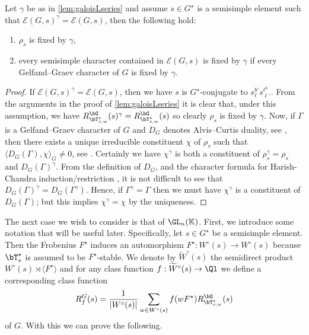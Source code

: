 \documentclass[eqthmnum, nocolour]{jt-calcs}
\begin{document}
\begin{prop}\label{prop:semisimple-chars-sigma-fixed}
Let $\gamma$ be as in \cref{lem:galoisLseries} and assume $s \in G^{\star}$ is a semisimple element such that $\mathcal{E}(G,s)^{\gamma} = \mathcal{E}(G,s)$, then the following hold:
\begin{enumerate}
	\item $\rho_s$ is fixed by $\gamma$,
	\item every semisimple character contained in $\mathcal{E}(G,s)$ is fixed by $\gamma$ if every Gelfand--Graev character of $G$ is fixed by $\gamma$.
\end{enumerate}
\end{prop}
\begin{proof}
If $\mathcal{E}(G,s)^{\gamma} = \mathcal{E}(G,s)$, then we have $s$ is $G^{\star}$-conjugate to $s_\ell^{b'}s_{\ell'}^{\ell^b}$. From the arguments in the proof of \cref{lem:galoisLseries} it is clear that, under this assumption, we have $R_{\bT_{s,w}^{\star}}^{\bG}(s)^{\gamma} = R_{\bT_{s,w}^{\star}}^{\bG}(s)$ so clearly $\rho_s$ is fixed by $\gamma$. Now, if $\Gamma$ is a Gelfand--Graev character of $G$ and $D_G$ denotes Alvis--Curtis duality, see \cite[8.8]{digne-michel:1991:representations-of-finite-groups-of-lie-type}, then there exists a unique irreducible constituent $\chi$ of $\rho_s$ such that $\langle D_G(\Gamma), \chi\rangle_G \neq 0$, see \cite[15.11]{bonnafe:2006:sln}. Certainly we have $\chi^{\gamma}$ is both a constituent of $\rho_s^{\gamma} = \rho_s$ and $D_G(\Gamma)^{\gamma}$. From the definition of $D_G$, and the character formula for Harish-Chandra induction/restriction \cite[4.5]{digne-michel:1991:representations-of-finite-groups-of-lie-type}, it is not difficult to see that $D_G(\Gamma)^{\gamma} = D_G(\Gamma^{\gamma})$. Hence, if $\Gamma^{\gamma} = \Gamma$ then we must have $\chi^{\gamma}$ is a constituent of $D_G(\Gamma)$; but this implies $\chi^{\gamma} = \chi$ by the uniqueness.
\end{proof}

\begin{pa}\label{pa:almost-chars}
The next case we wish to consider is that of $\GL_n(\mathbb{K})$.  First, we introduce some notation that will be useful later. Specifically, let $s \in G^{\star}$ be a semisimple element. Then the Frobenius $F^{\star}$ induces an automorphism $F^{\star} : W^{\circ}(s) \to W^{\circ}(s)$ because $\bT_s^{\star}$ is assumed to be $F^{\star}$-stable. We denote by $\widetilde{W}^{\circ}(s)$ the semidirect product $W^{\circ}(s) \rtimes\langle F^{\star} \rangle$ and for any class function $f : \widetilde{W}^{\circ}(s) \to \Ql$ we define a corresponding class function
\begin{equation*}
R^G_f(s) = \frac{1}{|W^{\circ}(s)|}\sum_{w \in W^{\circ}(s)} f(wF^{\star})R_{\bT_{s,w}^{\star}}^{\bG}(s)
\end{equation*}
of $G$. With this we can prove the following.
\end{pa}
\end{document}
